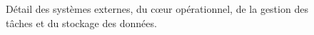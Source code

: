 \clearpage
\thispagestyle{plain}
\begin{figure}[p]
\centering
\resizebox{\linewidth}{!}{}
\caption{Détail des systèmes externes, du cœur opérationnel, de la gestion des tâches et du stockage des données.}
\label{fig:architecture-detail}
\end{figure}
\clearpage
